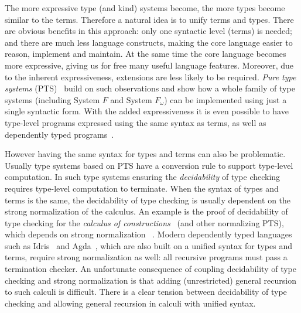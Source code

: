 The more expressive type (and kind) systems become, the more types become similar
to the terms. Therefore a natural idea is to unify terms and
types. There are obvious benefits in this approach: only one syntactic
level (terms) is needed; and there are much less language constructs,
making the core language easier to reason, implement and maintain. At the same
time the core language becomes more expressive, giving us for free
many useful language features. Moreover, due to the inherent
expressiveness, extensions are less likely to be required.
\emph{Pure type systems} (PTS)~\cite{handbook} build
on such observations and show how a whole family of type systems
(including System $F$ and System $F_{\omega}$) can be implemented
using just a single syntactic form. With the added expressiveness it
is even possible to have type-level programs expressed using the same
syntax as terms, as well as dependently typed programs~\cite{coc}.

However having the same syntax for types and terms can also be
problematic. Usually type systems based on PTS have a conversion rule
to support type-level computation.  In such type systems ensuring the
\emph{decidability} of type checking requires type-level computation
to terminate. When the syntax of types and terms is the same, the
decidability of type checking is usually dependent on the strong
normalization of the calculus. An example is the proof of decidability
of type checking for the \emph{calculus of constructions}~\cite{coc}
(and other normalizing PTS), which depends on strong normalization
~\cite{pts:normalize}.  Modern dependently
typed languages such as Idris~\cite{idris} and Agda~\cite{agda}, which are also
built on a unified syntax for types and terms, require strong
normalization as well: all recursive programs must pass a termination
checker.  An unfortunate consequence of coupling
decidability of type checking and strong normalization is that adding
(unrestricted) general recursion to such calculi is difficult. There
is a clear tension between decidability of type checking and allowing
general recursion in calculi with unified syntax.

